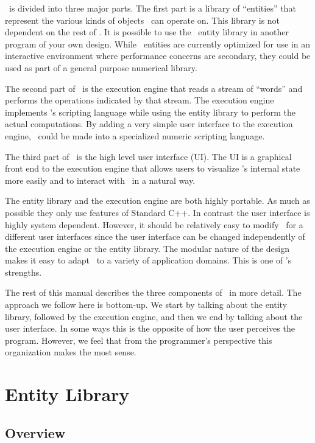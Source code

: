 \documentclass{report}
\begin{document}
\CLAC\ is divided into three major parts. The first part is a library of ``entities'' that
represent the various kinds of objects \CLAC\ can operate on. This library is not dependent on
the rest of \CLAC. It is possible to use the \CLAC\ entity library in another program of your
own design. While \CLAC\ entities are currently optimized for use in an interactive environment
where performance concerns are secondary, they could be used as part of a general purpose
numerical library.

The second part of \CLAC\ is the execution engine that reads a stream of ``words'' and performs
the operations indicated by that stream. The execution engine implements \CLAC's scripting
language while using the entity library to perform the actual computations. By adding a very
simple user interface to the execution engine, \CLAC\ could be made into a specialized numeric
scripting language.

The third part of \CLAC\ is the high level user interface (UI). The UI is a graphical front end
to the execution engine that allows users to visualize \CLAC's internal state more easily and to
interact with \CLAC\ in a natural way.

The entity library and the execution engine are both highly portable. As much as possible they
only use features of Standard C++. In contrast the user interface is highly system dependent.
However, it should be relatively easy to modify \CLAC\ for a different user interfaces since the
user interface can be changed independently of the execution engine or the entity library. The
modular nature of the design makes it easy to adapt \CLAC\ to a variety of application domains.
This is one of \CLAC's strengths.

The rest of this manual describes the three components of \CLAC\ in more detail. The approach we
follow here is bottom-up. We start by talking about the entity library, followed by the
execution engine, and then we end by talking about the user interface. In some ways this is the
opposite of how the user perceives the program. However, we feel that from the programmer's
perspective this organization makes the most sense.

\chapter{Entity Library}

\section{Overview}
\end{document}
